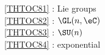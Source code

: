 \ref {THTOC81} : Lie groups\\
\ref {THTOC82} : \( \GL (n,\eC )\)\\
\ref {THTOC83} : \( \SU (n)\)\\
\ref {THTOC84} : exponential\\
